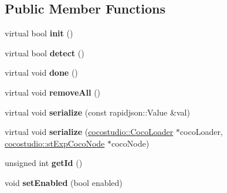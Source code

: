 \subsection*{Public Member Functions}
\begin{DoxyCompactItemize}
\item 
\mbox{\label{classcocostudio_1_1TriggerObj_aa1ad68d6b4d639b3a28b1d173690a7f6}} 
virtual bool {\bfseries init} ()
\item 
\mbox{\label{classcocostudio_1_1TriggerObj_a3a3cdef5163b23de4d8a400c0cb1dc75}} 
virtual bool {\bfseries detect} ()
\item 
\mbox{\label{classcocostudio_1_1TriggerObj_a076da12ec21e42442bc87384ae37ae42}} 
virtual void {\bfseries done} ()
\item 
\mbox{\label{classcocostudio_1_1TriggerObj_a481afbc61cf3537edd14d1f14640aa56}} 
virtual void {\bfseries remove\+All} ()
\item 
\mbox{\label{classcocostudio_1_1TriggerObj_a2d52e97bf7d54a956721b2bc4da30eb7}} 
virtual void {\bfseries serialize} (const rapidjson\+::\+Value \&val)
\item 
\mbox{\label{classcocostudio_1_1TriggerObj_a2a07e280d024b5222ba3eacc81b0bb17}} 
virtual void {\bfseries serialize} (\hyperlink{classcocostudio_1_1CocoLoader}{cocostudio\+::\+Coco\+Loader} $\ast$coco\+Loader, \hyperlink{structcocostudio_1_1stExpCocoNode}{cocostudio\+::st\+Exp\+Coco\+Node} $\ast$coco\+Node)
\item 
\mbox{\label{classcocostudio_1_1TriggerObj_a0e275c0c776d8804eb293dc03b0c43fd}} 
unsigned int {\bfseries get\+Id} ()
\item 
\mbox{\label{classcocostudio_1_1TriggerObj_a465c69ec271421af612746fb93482247}} 
void {\bfseries set\+Enabled} (bool enabled)
\item 
\mbox{\label{classcocostudio_1_1TriggerObj_abd061a105df0f0483a07904dcd209dd8}} 

\end{DoxyCompactItemize}
